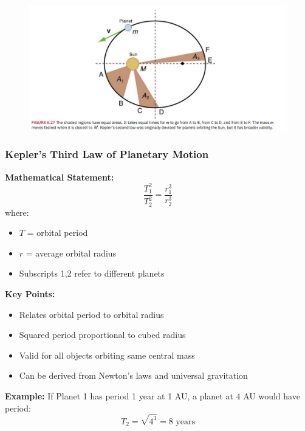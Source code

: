 \documentclass{beamer}
\begin{document}
\begin{frame}
\begin{figure}
    \centering
    \includegraphics[width=1\linewidth]{phys12-gravity-kepler-orbital-diagram.png}
\end{figure}
\end{frame}

\begin{frame}
\frametitle{Kepler's Third Law of Planetary Motion}

\textbf{Mathematical Statement:}
\[ \frac{T_1^2}{T_2^2} = \frac{r_1^3}{r_2^3} \]
where:
\begin{itemize}
    \item $T$ = orbital period
    \item $r$ = average orbital radius
    \item Subscripts 1,2 refer to different planets
\end{itemize}

\textbf{Key Points:}
\begin{itemize}
    \item Relates orbital period to orbital radius
    \item Squared period proportional to cubed radius
    \item Valid for all objects orbiting same central mass
    \item Can be derived from Newton's laws and universal gravitation
\end{itemize}

\textbf{Example:}
If Planet 1 has period 1 year at 1 AU, a planet at 4 AU would have period:
\[ T_2 = \sqrt{4^3} = 8 \text{ years} \]
\end{frame}
\end{document}
